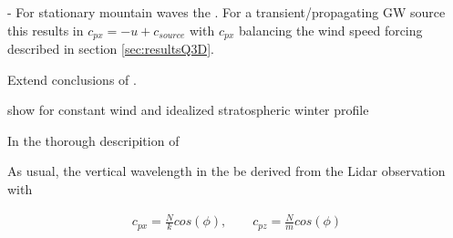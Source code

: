 - For stationary mountain waves the . For a transient/propagating GW source this results in $c_{px}=-u+c_{source}$ with $c_{px}$ balancing the wind speed forcing described in section \ref{sec:resultsQ3D}.



Extend conclusions of \textcite{dornbrack_interpretation_2017}.







show for constant wind and idealized stratospheric winter profile

In the thorough descripition of 


As usual, the vertical wavelength in the  be derived from the Lidar observation with


\begin{equation}
\begin{aligned}
    c_{px} = \frac{N}{k} cos(\phi), \qquad c_{pz} = \frac{N}{m} cos(\phi)
\end{aligned}
\end{equation}



